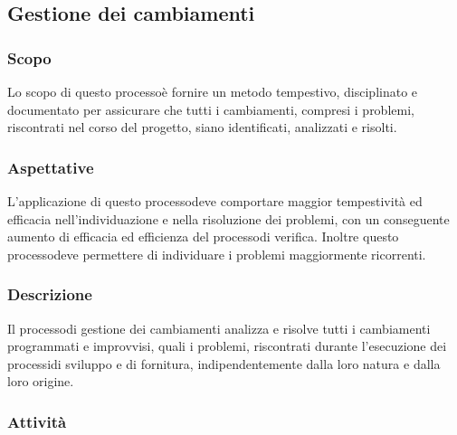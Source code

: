 \subsection{Gestione dei cambiamenti}
\subsubsection{Scopo}
Lo scopo di questo processo\glosp è fornire un metodo tempestivo, disciplinato e documentato per assicurare che tutti i cambiamenti, compresi i problemi, riscontrati nel corso del progetto\glo, siano identificati, analizzati e risolti.
\subsubsection{Aspettative}
L'applicazione di questo processo\glosp deve comportare maggior tempestività ed efficacia nell'individuazione e nella risoluzione dei problemi, con un conseguente aumento di efficacia ed efficienza del processo\glosp di verifica. Inoltre questo processo\glosp deve permettere di individuare i problemi maggiormente ricorrenti.
\subsubsection{Descrizione} 
Il processo\glosp di gestione dei cambiamenti analizza e risolve tutti i cambiamenti programmati e improvvisi, quali i problemi, riscontrati durante l'esecuzione dei processi\glosp di sviluppo e di fornitura, indipendentemente dalla loro natura e dalla loro origine. 
\subsubsection{Attività}
